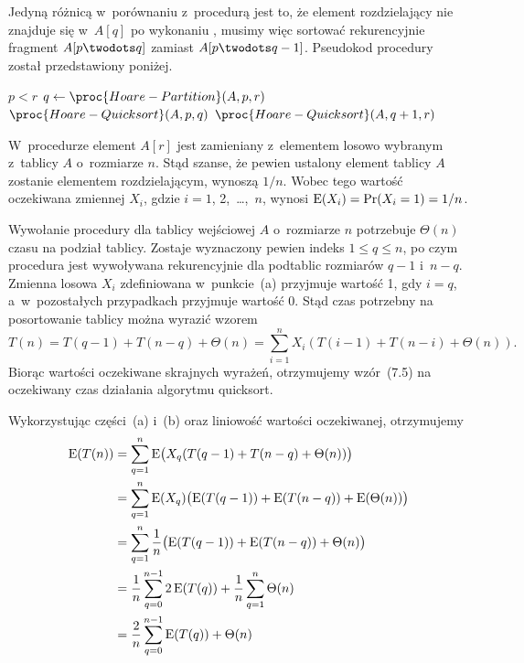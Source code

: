 \subproblem %
Jedyną różnicą w~porównaniu z~procedurą  jest to, że element rozdzielający nie znajduje się w~$A[q]$ po wykonaniu , musimy więc sortować rekurencyjnie fragment $A[p\twodots q]$ zamiast $A[p\twodots q-1]$. Pseudokod procedury został przedstawiony poniżej.
\begin{codebox}
\li	\If $p<r$
\li		\Then
			$q\gets\proc{Hoare-Partition}(A,p,r)$
\li			$\proc{Hoare-Quicksort}(A,p,q)$
\li			$\proc{Hoare-Quicksort}(A,q+1,r)$
		\End
\end{codebox}


\subproblem %
W~procedurze  element $A[r]$ jest zamieniany z~elementem losowo wybranym z~tablicy $A$ o~rozmiarze $n$. Stąd szanse, że pewien ustalony element tablicy $A$ zostanie elementem rozdzielającym, wynoszą $1/n$. Wobec tego wartość oczekiwana zmiennej $X_i$, gdzie $i=1$, 2,~\dots,~$n$, wynosi $\operatorname{E}(X_i)=\Pr(X_i=1)=1/n$.

\subproblem %
Wywołanie procedury  dla tablicy wejściowej $A$ o~rozmiarze $n$ potrzebuje $\Theta(n)$ czasu na podział tablicy. Zostaje wyznaczony pewien indeks $1\le q\le n$, po czym procedura jest wywoływana rekurencyjnie dla podtablic rozmiarów $q-1$ i~$n-q$. Zmienna losowa $X_i$ zdefiniowana w~punkcie~(a) przyjmuje wartość 1, gdy $i=q$, a~w~pozostałych przypadkach przyjmuje wartość 0. Stąd czas potrzebny na posortowanie  tablicy można wyrazić wzorem
\[
	T(n) = T(q-1)+T(n-q)+\Theta(n) = \sum_{i=1}^nX_i(T(i-1)+T(n-i)+\Theta(n)).
\]
Biorąc wartości oczekiwane skrajnych wyrażeń, otrzymujemy wzór~(7.5) na oczekiwany czas działania algorytmu quicksort.

\subproblem %
Wykorzystując części~(a) i~(b) oraz liniowość wartości oczekiwanej, otrzymujemy
\begin{align*}
	\operatorname{E}(T(n)) &= \sum_{q=1}^n\operatorname{E}\bigl(X_q(T(q-1)+T(n-q)+\Theta(n))\bigr) \\
	&= \sum_{q=1}^n\operatorname{E}(X_q)\bigl(\operatorname{E}(T(q-1))+\operatorname{E}(T(n-q))+\operatorname{E}(\Theta(n))\bigr) \\
	&= \sum_{q=1}^n\frac{1}{n}\bigl(\operatorname{E}(T(q-1))+\operatorname{E}(T(n-q))+\Theta(n)\bigr) \\
	&= \frac{1}{n}\sum_{q=0}^{n-1}2\operatorname{E}(T(q))+\frac{1}{n}\sum_{q=1}^n\Theta(n) \\
	&= \frac{2}{n}\sum_{q=0}^{n-1}\operatorname{E}(T(q))+\Theta(n)
\end{align*}

